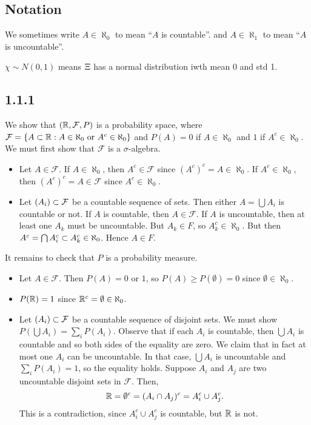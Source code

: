 \documentclass[11pt]{article}
\begin{document}
\subsection*{Notation}

We sometimes write $A \in \aleph_0$ to mean ``$A$ is countable''. and $A \in \aleph_1$ to mean ``$A$ is uncountable''. 

$\chi \sim N(0,1)$ means $\Xi$ has a normal distribution iwth mean 0 and std 1.

\subsection*{1.1.1}

We show that $({\mathbb R}, \mathcal{F}, P)$ is a probability space, where $\mathcal{F} = \{A \subset {\mathbb R} : A \in \aleph_0 \text{ or } A^c \in \aleph_0\}$ and $P(A) = 0$ if $A \in \aleph_0$ and $1$ if $A^c \in \aleph_0$. We must first show that $\mathcal{F}$ is a $\sigma$-algebra. 

\begin{itemize}
    \item Let $A \in \mathcal{F}$. If $A \in \aleph_0$, then $A^c \in \mathcal{F}$ since $(A^c)^c = A \in \aleph_0$. If $A^c \in \aleph_0$, then $(A^c)^c = A \in \mathcal{F}$ since $A^c \in \aleph_0$.
    \item Let $(A_i) \subset \mathcal{F}$ be a countable sequence of sets. Then either $A = \bigcup A_i$ is countable or not. If $A$ is countable, then $A \in \mathcal{F}$. If $A$ is uncountable, then at least one $A_k$ must be uncountable. But $A_k \in F$, so $A_k^c \in \aleph_0$. But then $A^c = \bigcap A_i^c \subset A_k^c \in \aleph_0$. Hence $A \in F$.
\end{itemize} 

It remains to check that $P$ is a probability measure. 

\begin{itemize}
    \item Let $A \in \mathcal{F}$. Then $P(A) = 0$ or $1$, so $P(A) \geq P(\emptyset) = 0$ since $\emptyset \in \aleph_0$.
    \item $P({\mathbb R}) = 1$ since ${\mathbb R}^c = \emptyset \in \aleph_0$.
    \item Let $(A_i) \subset \mathcal{F}$ be a countable sequence of disjoint sets. We must show $P(\bigcup A_i) = \sum_i P(A_i)$. Observe that if each $A_i$ is countable, then $\bigcup A_i$ is countable and so both sides of the equality are zero. We claim that in fact at most one $A_i$ can be uncountable. In that case, $\bigcup A_i$ is uncountable and $\sum_i P(A_i) = 1$, so the equality holds. Suppose $A_i$ and $A_j$ are two uncountable disjoint sets in $\mathcal{F}$. Then, \[{\mathbb R} = \emptyset^c = (A_i \cap A_j)^c = A_i^c \cup A_j^c.\] This is a contradiction, since $A_i^c \cup A_j^c$ is countable, but ${\mathbb R}$ is not. 
\end{itemize}
\end{document}
